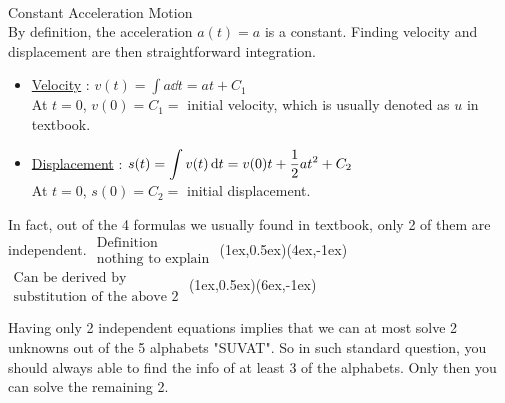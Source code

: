 \documentclass[class=article, crop=false, 12pt]{standalone}
\begin{document}
\hfill\\
\begin{example} Constant Acceleration Motion\\

    By definition, the acceleration $a(t) = a$ is a constant. 
    Finding velocity and displacement are then straightforward integration.

    \begin{itemize}
        \item \ul{Velocity} : $v(t) = \displaystyle \int a \dd{t} = at + C_1$ \\[0.5em]
        At $t=0$, $v(0) = C_1 =$ initial velocity, which is usually denoted as $u$ in textbook.

        \item \ul{Displacement} : $s(t) = \displaystyle \int v(t) \dd{t} = v(0)t + \frac{1}{2} at^2 + C_2$ \\[0.5em]
        At $t=0$, $s(0) = C_2 =$ initial displacement.
    \end{itemize}
    
    In fact, out of the 4 formulas we usually found in textbook, only 2 of them are independent.
    {$\substack{\displaystyle\text{Definition}\\\displaystyle\text{nothing to explain}}$}
    {(1ex,0.5ex)}{(4ex,-1ex)}
    {$\substack{\displaystyle\text{Can be derived by}\\\displaystyle\text{substitution of the above 2}}$}
    {(1ex,0.5ex)}{(6ex,-1ex)}

    Having only 2 independent equations implies that we can at most solve 2 unknowns out of the 5 alphabets "SUVAT".
    So in such standard question, you should always able to find the info of at least 3 of the alphabets.
    Only then you can solve the remaining 2. 

\end{example}
\end{document}
